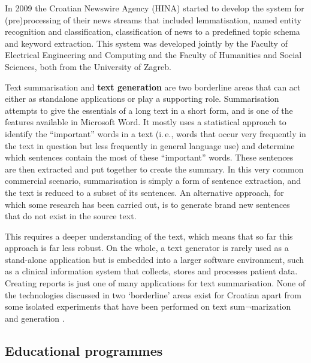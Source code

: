 \begin{multicols}{2}
In 2009 the Croatian Newswire Agency (HINA) \cite{str25} started to develop the system for (pre)processing of their news streams that included lemmatisation, named entity recognition \cite{pro7} and classification, classification of news to a predefined topic schema and keyword extraction. This system was developed jointly by the Faculty of Electrical Engineering and Computing \cite{str26} and the Faculty of Humanities and Social Sciences, both from the University of Zagreb.

Text summarisation and \textbf{text generation} are two borderline areas that can act either as standalone applications or play a supporting role. Summarisation attempts to give the essentials of a long text in a short form, and is one of the features available in Microsoft Word. It mostly uses a statistical approach to identify the “important” words in a text (i.\,e., words that occur very frequently in the text in question but less frequently in general language use) and determine which sentences contain the most of these “important” words. These sentences are then extracted and put together to create the summary. In this very common commercial scenario, summarisation is simply a form of sentence extraction, and the text is reduced to a subset of its sentences. An alternative approach, for which some research has been carried out, is to generate brand new sentences that do not exist in the source text. 


This requires a deeper understanding of the text, which means that so far this approach is far less robust. On the whole, a text generator is rarely used as a stand-alone application but is embedded into a larger software environment, such as a clinical information system that collects, stores and processes patient data. Creating reports is just one of many applications for text summarisation. None of the technologies discussed in two ‘borderline’ areas exist for Croatian apart from some isolated experiments that have been performed on text sum¬marization \cite{art5} and generation \cite{art6}. 

\subsection{Educational programmes}


\end{multicols}

